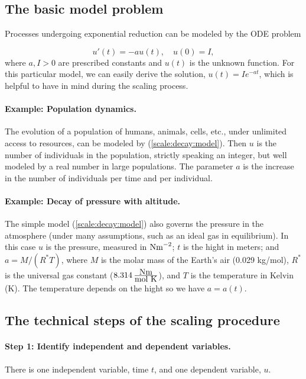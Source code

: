 \documentclass[graybox,envcountchap,sectrefs,final]{svmonodo}
\begin{document}
\subsection{The basic model problem}

Processes undergoing exponential reduction can be modeled by the ODE
problem

\begin{equation}
u'(t) = -au(t),\quad u(0)=I,
\label{scale:decay:model}
\end{equation}
where $a,I>0$ are prescribed constants and $u(t)$ is the unknown function.
For this particular model, we can easily derive the solution, $u(t)=Ie^{-at}$,
which is helpful to have in mind during the scaling process.

\paragraph{Example: Population dynamics.}
The evolution of a population of humans, animals, cells, etc.,
under unlimited access to resources, can be
modeled by (\ref{scale:decay:model}). Then $u$ is the number of
individuals in the population, strictly speaking an integer, but well
modeled by a real number in large populations.
The parameter $a$ is the increase in the number of individuals per
time and per individual.

\paragraph{Example: Decay of pressure with altitude.}
The simple model (\ref{scale:decay:model}) also governs the pressure
in the atmosphere (under many assumptions, such as an ideal gas in
equilibrium). In this case $u$ is the
pressure, measured in $\hbox{Nm}^{-2}$; $t$ is the hight in meters;
and $a=M/(R^*T)$, where
$M$ is the molar mass of the Earth's air (0.029 kg/mol),
$R^*$ is the universal
gas constant ($8.314\,\frac{\hbox{Nm}}{\hbox{mol K}}$),
and $T$ is the temperature in Kelvin (K).
The temperature depends on the hight so we have $a=a(t)$.


\subsection{The technical steps of the scaling procedure}
\label{sec:scale:decay:steps}

\paragraph{Step 1: Identify independent and dependent variables.}
There is one independent variable, time $t$, and one dependent variable,
$u$.
\end{document}
